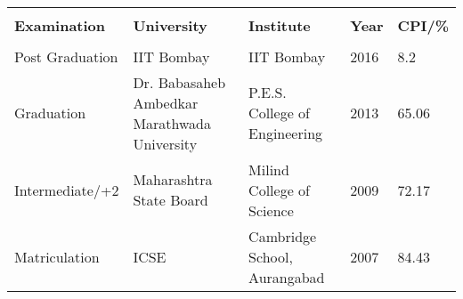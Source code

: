 \vspace{-0.2cm}
\\[\lsep]
\vspace{-0.1cm}
\\ \\
\indent \begin{tabular}{ l @{\hskip 0.3in} l @{\hskip 0.4in} l @{\hskip 0.4in} l @{\hskip 0.35in} l }
\hline
\vspace{-0.3cm} \\
\textbf{Examination} & \textbf{University} & \textbf{Institute} & \textbf{Year} & \textbf{CPI/\%} \\
\hline
\vspace{-0.2cm} \\
Post Graduation & IIT Bombay & IIT Bombay & 2016 & 8.2 \vspace{0.1cm} \\
Graduation & \begin{minipage}{0.23\linewidth} Dr. Babasaheb Ambedkar Marathwada University \end{minipage} & P.E.S. College of Engineering & 2013 & 65.06 \vspace{0.1cm} \\
Intermediate/+2 & Maharashtra State Board & Milind College of Science & 2009 & 72.17 \vspace{0.1cm} \\
Matriculation & ICSE & Cambridge School, Aurangabad & 2007 & 84.43 \vspace{0.1cm} \\
\hline
\end{tabular}
\\ \vspace{0.1cm}